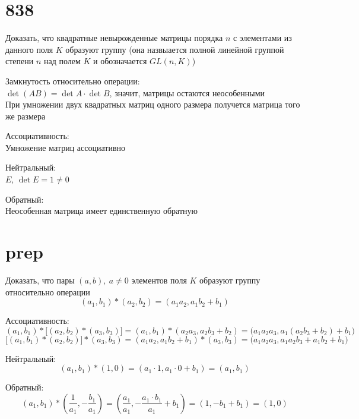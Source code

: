 \section{838}

Доказать, что квадратные невырожденные матрицы порядка $ n $ с элементами из данного поля $ K $ образуют группу (она назвыается полной линейной группой степени $ n $ над полем $ K $ и обозначается $ GL(n, K) $)

\begin{iproof}
    \item Замкнутость относительно операции: \\
    $ \det (AB) = \det A \cdot \det B $, значит, матрицы остаются неособенными \\
    При умножении двух квадратных матриц одного размера получется матрица того же размера
	\item Ассоциативность: \\
    Умножение матриц ассоциативно
    \item Нейтральный: \\
    $ E $, $ \det E = 1 \ne 0 $
    \item Обратный: \\
    Неособенная матрица имеет единственную обратную
\end{iproof}

\section{prep}

Доказать, что пары $ (a, b), ~ a \ne 0 $ элементов поля $ K $ образуют группу относительно операции
$$ (a_1, b_1) * (a_2, b_2) = (a_1a_2, a_1b_2 + b_1) $$

\begin{iproof}
	\item Ассоциативность:
    $$ (a_1, b_1) * \bigg[ (a_2, b_2) * (a_3, b_3) \bigg] = (a_1, b_1) * (a_2a_3, a_2b_3 + b_2) = \bigg( a_1a_2a_3, a_1(a_2b_3 + b_2) + b_1 \bigg) $$
    $$ \bigg[ (a_1, b_1) * (a_2, b_2) \bigg] * (a_3, b_3) = (a_1a_2, a_1b_2 + b_1) * (a_3, b_3) = \bigg( a_1a_2a_3, a_1a_2b_3 + a_1b_2 + b_1 \bigg) $$
    \item Нейтральный:
    $$ (a_1, b_1) * (1, 0) = (a_1 \cdot 1, a_1 \cdot 0 + b_1) = (a_1, b_1) $$
    \item Обратный:
    $$ (a_1, b_1) * (\frac1{a_1}, -\frac{b_1}{a_1}) = (\frac{a_1}{a_1}, -\frac{a_1 \cdot b_1}{a_1} + b_1) = (1, -b_1 + b_1) = (1, 0) $$
\end{iproof}


